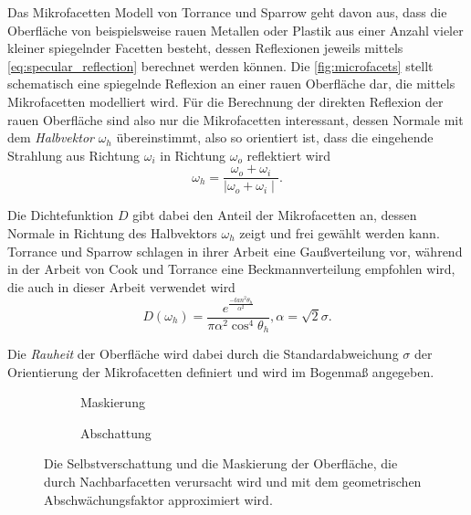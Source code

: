 \documentclass[thesis.tex]{subfiles}
\begin{document}
Das Mikrofacetten Modell von Torrance und Sparrow geht davon aus, dass die Oberfläche von beispielsweise rauen Metallen oder Plastik aus einer Anzahl vieler kleiner spiegelnder Facetten besteht, dessen Reflexionen jeweils mittels \autoref{eq:specular_reflection} berechnet werden können. Die \autoref{fig:microfacets} stellt schematisch eine spiegelnde Reflexion an einer rauen Oberfläche dar, die mittels Mikrofacetten modelliert wird. Für die Berechnung der direkten Reflexion der rauen Oberfläche sind also nur die Mikrofacetten interessant, dessen Normale mit dem \emph{Halbvektor} $\omega_h$ übereinstimmt, also so orientiert ist, dass die eingehende Strahlung aus Richtung $\omega_i$ in Richtung $\omega_o$ reflektiert wird
\begin{equation}
\omega_h = \frac{\omega_o + \omega_i}{\mid\omega_o + \omega_i\mid}.
\end{equation} 

Die Dichtefunktion $D$ gibt dabei den Anteil der Mikrofacetten an, dessen Normale in Richtung des Halbvektors $\omega_h$ zeigt und frei gewählt werden kann. Torrance und Sparrow \cite{bib:TorranceSparrow1967} schlagen in ihrer Arbeit eine Gaußverteilung vor, während in der Arbeit von Cook und Torrance \cite{bib:CookTorrance1981} eine Beckmannverteilung empfohlen wird, die auch in dieser Arbeit verwendet wird
\begin{equation}
D(\omega_h) = \frac{e^{\frac{-tan^2\theta_h}{\alpha^2}}}{\pi\alpha^2\cos^4\theta_h}, \alpha = \sqrt2\sigma.
\end{equation}

Die \emph{Rauheit} der Oberfläche wird dabei durch die Standardabweichung $\sigma$ der Orientierung der Mikrofacetten definiert \cite{bib:Pharr2016} und wird im Bogenmaß angegeben. 

\begin{figure}[h]
\centering
\begin{subfigure}[b]{0.45\textwidth}
\centering
{}
\caption{Maskierung}
\label{fig:microfacet_masking}
\end{subfigure}
\begin{subfigure}[b]{0.45\textwidth}
\centering
{}
\caption{Abschattung}
\label{fig:microfacet_shading}
\end{subfigure}
\caption{Die Selbstverschattung und die Maskierung der Oberfläche, die durch Nachbarfacetten verursacht wird und mit dem geometrischen Abschwächungsfaktor approximiert wird.}
\end{figure}
\end{document}
